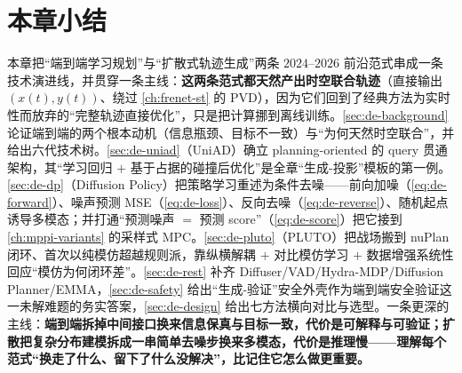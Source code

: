 \section*{本章小结}

本章把“端到端学习规划”与“扩散式轨迹生成”两条 $2024$--$2026$ 前沿范式串成一条技术演进线，并贯穿一条主线：\textbf{这两条范式都天然产出时空联合轨迹}（直接输出 $(x(t),y(t))$、绕过 \cref{ch:frenet-st} 的 PVD），因为它们回到了经典方法为实时性而放弃的“完整轨迹直接优化”，只是把计算挪到离线训练。\cref{sec:de-background} 论证端到端的两个根本动机（信息瓶颈、目标不一致）与“为何天然时空联合”，并给出六代技术树。\cref{sec:de-uniad}（UniAD）确立 planning-oriented 的 query 贯通架构，其“学习回归 $+$ 基于占据的碰撞后优化”是全章“生成-投影”模板的第一例。\cref{sec:de-dp}（Diffusion Policy）把策略学习重述为条件去噪——前向加噪（\cref{eq:de-forward}）、噪声预测 MSE（\cref{eq:de-loss}）、反向去噪（\cref{eq:de-reverse}）、随机起点诱导多模态；并打通“预测噪声 $=$ 预测 score”（\cref{eq:de-score}）把它接到 \cref{ch:mppi-variants} 的采样式 MPC。\cref{sec:de-pluto}（PLUTO）把战场搬到 nuPlan 闭环、首次以纯模仿超越规则派，靠纵横解耦 $+$ 对比模仿学习 $+$ 数据增强系统性回应“模仿为何闭环差”。\cref{sec:de-rest} 补齐 Diffuser/VAD/Hydra-MDP/Diffusion Planner/EMMA，\cref{sec:de-safety} 给出“生成-验证”安全外壳作为端到端安全验证这一未解难题的务实答案，\cref{sec:de-design} 给出七方法横向对比与选型。一条更深的主线：\textbf{端到端拆掉中间接口换来信息保真与目标一致，代价是可解释与可验证；扩散把复杂分布建模拆成一串简单去噪步换来多模态，代价是推理慢——理解每个范式“换走了什么、留下了什么没解决”，比记住它怎么做更重要。}


